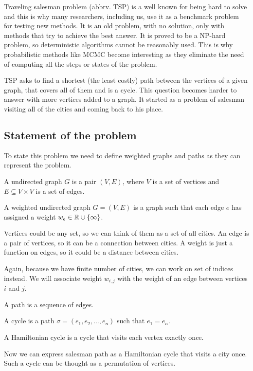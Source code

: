 Traveling salesman problem (abbrv. TSP) is a well known for being hard to solve and this is why many researchers, including us, use it as a benchmark problem for testing new methods. It is an old problem, with no solution, only with methods that try to achieve the best answer. It is proved to be a NP-hard problem, so deterministic algorithms cannot be reasonably used. This is why probabilistic methods like MCMC become interesting as they eliminate the need of computing all the steps or states of the problem.

TSP asks to find a shortest (the least costly) path between the vertices of a given graph, that covers all of them and is a cycle. This question becomes harder to answer with more vertices added to a graph. It started as a problem of salesman visiting all of the cities and coming back to his place.

\subsection{Statement of the problem}
	To state this problem we need to define weighted graphs and paths as they can represent the problem. 
	
	\begin{definition}
		A undirected graph $G$ is a pair $(V, E)$, where $V$ is a set of vertices and $E \subseteq V \times V$ is a set of edges.
	\end{definition}

	\begin{definition}
		A weighted undirected graph $G = (V, E)$ is a graph such that each edge $e$ has assigned a weight $w_e \in \mathbb{R} \cup \left\{ \infty \right\}$.
	\end{definition}
	Vertices could be any set, so we can think of them as a set of all cities. An edge is a pair of vertices, so it can be a connection between cities. A weight is just a function on edges, so it could be a distance between cities. 
	
	Again, because we have finite number of cities, we can work on set of indices instead. We will associate weight $w_{i,j}$ with the weight of an edge between vertices $i$ and $j$.
	
	\begin{definition}
		A path is a sequence of edges.
	\end{definition}
	
	\begin{definition}
		A cycle is a path $\sigma = (e_1, e_2, \ldots, e_n)$ such that $e_1 = e_n$.
	\end{definition}
	\begin{definition}
		A Hamiltonian cycle is a cycle that visits each vertex exactly once.
	\end{definition}
	Now we can express salesman path as a Hamiltonian cycle that visits a city once. Such a cycle can be thought as a permutation of vertices.
	
